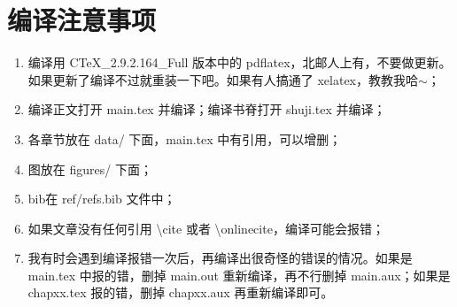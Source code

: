 
\chapter{编译注意事项}
\label{cha:compile}

\begin{enumerate}[1. ]
    \item 编译用 CTeX\_2.9.2.164\_Full 版本中的 pdflatex，北邮人上有，不要做更新。如果更新了编译不过就重装一下吧。如果有人搞通了 xelatex，教教我哈$\sim$；
    \item 编译正文打开 main.tex 并编译；编译书脊打开 shuji.tex 并编译；
    \item 各章节放在 data/ 下面，main.tex 中有引用，可以增删；
    \item 图放在 figures/ 下面；
    \item bib在 ref/refs.bib 文件中；
    \item 如果文章没有任何引用 \textbackslash cite 或者 \textbackslash onlinecite，编译可能会报错；
    \item 我有时会遇到编译报错一次后，再编译出很奇怪的错误的情况。如果是 main.tex 中报的错，删掉 main.out 重新编译，再不行删掉 main.aux；如果是 chapxx.tex 报的错，删掉 chapxx.aux 再重新编译即可。
\end{enumerate}






